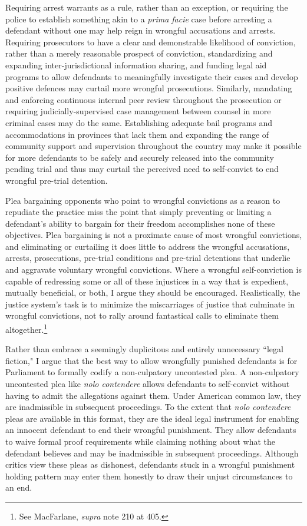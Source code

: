 Requiring arrest warrants as a rule, rather than an exception, or requiring the police to establish something akin to a \textit{prima facie} case before arresting a defendant without one may help reign in wrongful accusations and arrests. Requiring prosecutors to have a clear and demonstrable likelihood of conviction, rather than a merely reasonable prospect of conviction, standardizing and expanding inter-jurisdictional information sharing, and funding legal aid programs to allow defendants to meaningfully investigate their cases and develop positive defences may curtail more wrongful prosecutions. Similarly, mandating and enforcing continuous internal peer review throughout the prosecution or requiring judicially-supervised case management between counsel in more criminal cases may do the same. Establishing adequate bail programs and accommodations in provinces that lack them and expanding the range of community support and supervision throughout the country may make it possible for more defendants to be safely and securely released into the community pending trial and thus may curtail the perceived need to self-convict to end wrongful pre-trial detention. 

Plea bargaining opponents who point to wrongful convictions as a reason to repudiate the practice miss the point that simply preventing or limiting a defendant's ability to bargain for their freedom accomplishes none of these objectives. Plea bargaining is not a proximate cause of most wrongful convictions, and eliminating or curtailing it does little to address the wrongful accusations, arrests, prosecutions, pre-trial conditions and pre-trial detentions that underlie and aggravate voluntary wrongful convictions. Where a wrongful self-conviction is capable of redressing some or all of these injustices in a way that is expedient, mutually beneficial, or both, I argue they should be encouraged. Realistically, the justice system's task is to minimize the miscarriages of justice that culminate in wrongful convictions, not to rally around fantastical calls to eliminate them altogether.\footnote{See MacFarlane, \textit{supra} note 210 at 405.} 

Rather than embrace a seemingly duplicitous and entirely unnecessary ``legal fiction," I argue that the best way to allow wrongfully punished defendants is for Parliament to formally codify a non-culpatory uncontested plea. A non-culpatory uncontested plea like \textit{nolo contendere} allows defendants to self-convict without having to admit the allegations against them. Under American common law, they are inadmissible in subsequent proceedings. To the extent that \textit{nolo contendere} pleas are available in this format, they are the ideal legal instrument for enabling an innocent defendant to end their wrongful punishment. They allow defendants to waive formal proof requirements while claiming nothing about what the defendant believes and may be inadmissible in subsequent proceedings. Although critics view these pleas as dishonest, defendants stuck in a wrongful punishment holding pattern may enter them honestly to draw their unjust circumstances to an end.

